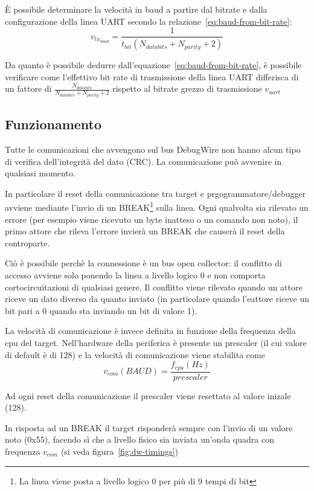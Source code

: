È possibile determinare la velocità in baud a partire dal bitrate e dalla configurazione della linea UART secondo la relazione~\ref{eq:baud-from-bit-rate}\cite{site:baud}:
\begin{equation}\label{eq:baud-from-bit-rate}
    v_{tx_{baud}} = \frac{1}{t_{bit}(N_{databits} + N_{parity} + 2)}
\end{equation}

Da quanto è possibile dedurre dall'equazione~\ref{eq:baud-from-bit-rate}, è possibile verificare come l'effettivo bit rate di trasmissione della linea UART differisca di un fattore di \(\frac{N_{databits}}{N_{databits} + N_{parity} + 2}\) rispetto al bitrate grezzo di trasmissione \(v_{uart}\)

\subsection{Funzionamento}

Tutte le comunicazioni che avvengono sul bus DebugWire non hanno alcun tipo di verifica dell'integrità del dato (CRC). La comunicazione può avvenire in qualsiasi momento.

In particolare il reset della comunicazione tra target e prgogrammatore/debugger avviene mediante l'invio di un BREAK\footnote{La linea viene posta a livello logico 0 per più di 9 tempi di bit} sulla linea.
Ogni qualvolta sia rilevato un errore (per esempio viene ricevuto un byte inatteso o un comando non noto), il primo attore che rileva l'errore invierà un BREAK che causerà il reset della controparte.

Ciò è possibile perchè la connessione è un bus open collector: il conflitto di accesso avviene solo ponendo la linea a livello logico 0 e non comporta cortocircuitazioni di qualsiasi genere. Il conflitto viene rilevato quando un attore riceve un dato diverso da quanto inviato (in particolare quando l'eattore riceve un bit pari a 0 quando sta inviando un bit di valore 1).

La velocità di comunicazione è invece definita in funzione della frequenza della cpu del target. Nell'hardware della periferica è presente un prescaler (il cui valore di default è di 128) e la velocità di comunicazione viene stabilita come \[v_{com} (BAUD) = \frac{f_{cpu} (Hz)}{prescaler}\]

Ad ogni reset della comunicazione il prescaler viene resettato al valore inizale (128).

In risposta ad un BREAK il target risponderà sempre con l'invio di un valore noto (0x55), facendo sì che a livello fisico sia inviata un'onda quadra con frequenza \(v_{com}\)\cite{site:dw-reverse-engeneering} (si veda figura~\ref{fig:dw-timings})

